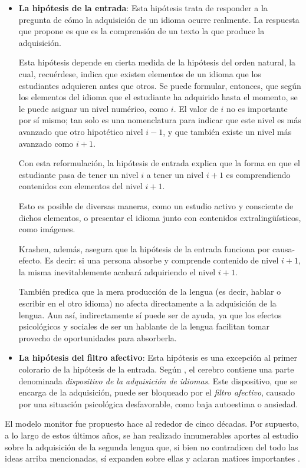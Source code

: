 \begin{itemize}
	\item \textbf{La hipótesis de la entrada}: Esta hipótesis trata de responder a la pregunta de cómo la adquisición de un idioma ocurre realmente. La respuesta que propone es que es la comprensión de un texto la que produce la adquisición.
	
	Esta hipótesis depende en cierta medida de la hipótesis del orden natural, la cual, recuérdese, indica que existen elementos de un idioma que los estudiantes adquieren antes que otros. Se puede formular, entonces, que según los elementos del idioma que el estudiante ha adquirido hasta el momento, se le puede asignar un nivel numérico, como $i$. El valor de $i$ no es importante por sí mismo; tan solo es una nomenclatura para indicar que este nivel es más avanzado que otro hipotético nivel $i - 1$, y que también existe un nivel más avanzado como $i + 1$.
	
	Con esta reformulación, la hipótesis de entrada explica que la forma en que el estudiante pasa de tener un nivel $i$ a tener un nivel $i + 1$ es comprendiendo contenidos con elementos del nivel $i + 1$.
	
	Esto es posible de diversas maneras, como un estudio activo y consciente de dichos elementos, o presentar el idioma junto con contenidos extralingüísticos, como imágenes.
	
	Krashen, además, asegura que la hipótesis de la entrada funciona por causa-efecto. Es decir: si una persona absorbe y comprende contenido de nivel $i + 1$, la misma inevitablemente acabará adquiriendo el nivel $i + 1$.
	
	También predica que la mera producción de la lengua (es decir, hablar o escribir en el otro idioma) no afecta directamente a la adquisición de la lengua. Aun así, indirectamente sí puede ser de ayuda, ya que los efectos psicológicos y sociales de ser un hablante de la lengua facilitan tomar provecho de oportunidades para absorberla.
	
	\item \textbf{La hipótesis del filtro afectivo}: Esta hipótesis es una excepción al primer colorario de la hipótesis de la entrada. Según \todo, el cerebro contiene una parte denominada \textit{dispositivo de la adquisición de idiomas}. Este dispositivo, que se encarga de la adquisición, puede ser bloqueado por el \textit{filtro afectivo}, causado por una situación psicológica desfavorable, como baja autoestima o ansiedad.
\end{itemize}

El modelo monitor fue propuesto hace al rededor de cinco décadas. Por supuesto, a lo largo de estos últimos años, se han realizado innumerables aportes al estudio sobre la adquisición de la segunda lengua que, si bien no contradicen del todo las ideas arriba mencionadas, sí expanden sobre ellas y aclaran matices importantes \autocite{https://doi.org/10.1111/flan.12552}. \todo[¿Cuáles?]


